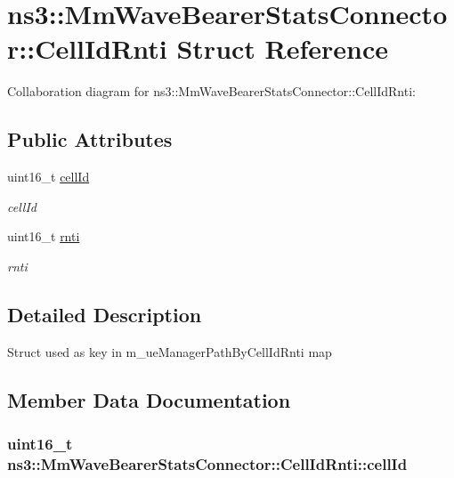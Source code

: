 \hypertarget{structns3_1_1MmWaveBearerStatsConnector_1_1CellIdRnti}{}\section{ns3\+:\+:Mm\+Wave\+Bearer\+Stats\+Connector\+:\+:Cell\+Id\+Rnti Struct Reference}
\label{structns3_1_1MmWaveBearerStatsConnector_1_1CellIdRnti}


Collaboration diagram for ns3\+:\+:Mm\+Wave\+Bearer\+Stats\+Connector\+:\+:Cell\+Id\+Rnti\+:
\subsection*{Public Attributes}
\begin{DoxyCompactItemize}
\item 
uint16\+\_\+t \hyperlink{structns3_1_1MmWaveBearerStatsConnector_1_1CellIdRnti_a9a9748436d73ce45c6a5a9a1ccea9168}{cell\+Id}
\begin{DoxyCompactList}\small\item\em cell\+Id \end{DoxyCompactList}\item 
uint16\+\_\+t \hyperlink{structns3_1_1MmWaveBearerStatsConnector_1_1CellIdRnti_af9e747eb73bc472faad6e24374a3645c}{rnti}
\begin{DoxyCompactList}\small\item\em rnti \end{DoxyCompactList}\end{DoxyCompactItemize}


\subsection{Detailed Description}
Struct used as key in m\+\_\+ue\+Manager\+Path\+By\+Cell\+Id\+Rnti map 

\subsection{Member Data Documentation}
\subsubsection[{\texorpdfstring{cell\+Id}{cellId}}]{\setlength{\rightskip}{0pt plus 5cm}uint16\+\_\+t ns3\+::\+Mm\+Wave\+Bearer\+Stats\+Connector\+::\+Cell\+Id\+Rnti\+::cell\+Id}\hypertarget{structns3_1_1MmWaveBearerStatsConnector_1_1CellIdRnti_a9a9748436d73ce45c6a5a9a1ccea9168}{}\label{structns3_1_1MmWaveBearerStatsConnector_1_1CellIdRnti_a9a9748436d73ce45c6a5a9a1ccea9168}


